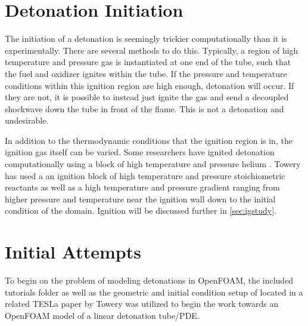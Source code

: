 

\section{Detonation Initiation}
\label{sec:ignition}

The initiation of a detonation is seemingly trickier computationally than it is experimentally. There are several methods to do this. Typically, a region of high temperature and pressure gas is instantiated at one end of the tube, such that the fuel and oxidizer ignites within the tube. If the pressure and temperature conditions within this ignition region are high enough, detonation will occur. If they are not, it is possible to instead just ignite the gas and send a decoupled shockwave down the tube in front of the flame. This is not a detonation and undesirable. 

In addition to the thermodynamic conditions that the ignition region is in, the ignition gas itself can be varied. Some researchers have ignited detonation computationally using a block of high temperature and pressure helium \cite{marcantoni}. Towery has used a an ignition block of high temperature and pressure stoichiometric reactants \cite{towery1} as well as a high temperature and pressure gradient \cite{towery2} ranging from higher pressure and temperature near the ignition wall down to the initial condition of the domain. Ignition will be discussed further in \ref{sec:igstudy}.





\section{Initial Attempts}
To begin on the problem of modeling detonations in OpenFOAM, the included tutorials folder as well as the geometric and initial condition setup of located in a related TESLa paper by Towery\cite{towery1} was utilized to begin the work towards an OpenFOAM model of a linear detonation tube/PDE.


